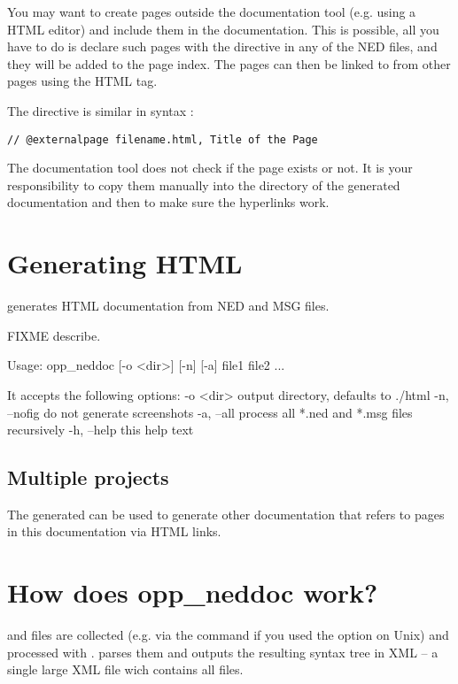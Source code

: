 You may want to create pages outside the documentation tool
(e.g. using a HTML editor) and include them in the documentation.
This is possible, all you have to do is declare such pages with
the  directive in any of the NED files, and
they will be added to the page index. The pages can then be linked to
from other pages using the HTML  tag.

The  directive is similar in syntax
:

\begin{verbatim}
// @externalpage filename.html, Title of the Page
\end{verbatim}

The documentation tool does not check if the page exists
or not. It is your responsibility to copy them manually into
the directory of the generated documentation and then to make
sure the hyperlinks work.



\section{Generating HTML}

 generates HTML documentation from NED and MSG files.

FIXME describe.

Usage: opp\_neddoc [-o <dir>] [-n] [-a] file1 file2 ...

It accepts the following options:
 -o <dir>      output directory, defaults to ./html
 -n, --nofig   do not generate screenshots
 -a, --all     process all *.ned and *.msg files recursively
 -h, --help    this help text



\subsection{Multiple projects}

The generated  can be used to generate other documentation
that refers to pages in this documentation via HTML links.


\section{How does opp\_neddoc work?}

 and  files are collected (e.g. via the 
command if you used the  option on Unix) and processed
with .  parses them and outputs the resulting syntax
tree in XML -- a single large XML file wich contains all files.

